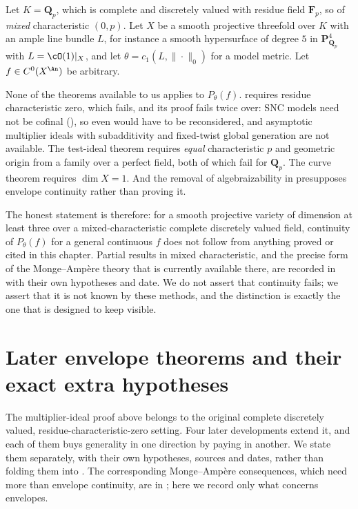 \begin{example}
\label{ex:ch23-outside-scope}
Let \(K=\mathbf Q_p\), which is complete and discretely valued with residue
field \(\mathbf F_p\), so of \emph{mixed} characteristic \((0,p)\).  Let
\(X\) be a smooth projective threefold over \(K\) with an ample line bundle
\(L\), for instance a smooth hypersurface of degree \(5\) in
\(\mathbf P^4_{\mathbf Q_p}\) with \(L=\cO(1)|_X\), and let
\(\theta=c_1(L,\|\cdot\|_0)\) for a model metric.  Let \(f\in C^0(X^{\An})\)
be arbitrary.

None of the theorems available to us applies to \(P_\theta(f)\).
 requires residue characteristic zero,
which fails, and its proof fails twice over: SNC models need not be cofinal
(), so even
 would have to be reconsidered, and asymptotic
multiplier ideals with subadditivity and fixed-twist global generation are
not available.  The test-ideal theorem
 requires \emph{equal}
characteristic \(p\) and geometric origin from a family over a perfect
field, both of which fail for \(\mathbf Q_p\).  The curve theorem
 requires \(\dim X=1\).  And the
removal of algebraizability in
 presupposes envelope continuity
rather than proving it.

The honest statement is therefore: for a smooth projective variety of
dimension at least three over a mixed-characteristic complete discretely
valued field, continuity of \(P_\theta(f)\) for a general continuous \(f\)
does not follow from anything proved or cited in this chapter.  Partial
results in mixed characteristic, and the precise form of the
Monge--Amp\`ere theory that is currently available there, are recorded in
 with their own hypotheses and date.
We do not assert that continuity fails; we assert that it is not known by
these methods, and the distinction is exactly the one that
 is designed to keep visible.
\end{example}

\section{Later envelope theorems and their exact extra hypotheses}
\label{sec:ch23-later}

The multiplier-ideal proof above belongs to the original complete discretely
valued, residue-characteristic-zero setting.  Four later developments extend
it, and each of them buys generality in one direction by paying in another.
We state them separately, with their own hypotheses, sources and dates,
rather than folding them into
.  The corresponding
Monge--Amp\`ere consequences, which need more than envelope continuity, are
in ; here we record only what concerns envelopes.

